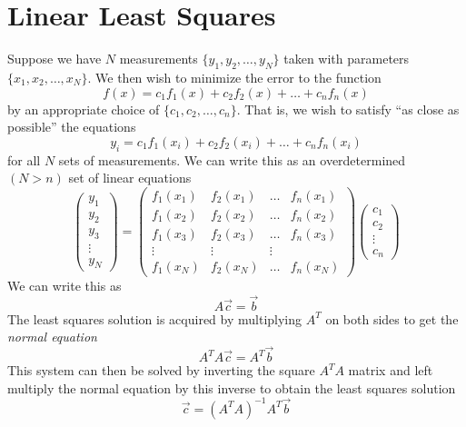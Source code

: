 \section{Linear Least Squares} \label{sec:append_linear_lsq}
Suppose we have $N$ measurements $\{y_1, y_2, \ldots , y_N\}$ taken with parameters $\{x_1, x_2, \ldots , x_N\}$. We then wish to minimize the error to the function
\begin{equation} \label{append_basis_combo}
	f(x) = c_1 f_1(x) + c_2 f_2(x) + \ldots + c_n f_n(x)
\end{equation}
by an appropriate choice of $\{c_1, c_2, \ldots, c_n\}$. That is, we wish to satisfy ``as close as possible'' the equations
\begin{equation}
	y_i = c_1 f_1(x_i) + c_2 f_2(x_i) + \ldots + c_n f_n(x_i)
\end{equation}
for all $N$ sets of measurements. We can write this as an overdetermined $(N>n)$ set of linear equations
\begin{equation} \label{append_lsq_matrix_setup}
	\begin{pmatrix}
		y_1 \\
		y_2 \\
		y_3 \\
		\vdots \\
		y_N
	\end{pmatrix} =
	\begin{pmatrix}
		f_1(x_1) & f_2(x_1) & \ldots & f_n(x_1) \\
		f_1(x_2) & f_2(x_2) & \ldots & f_n(x_2) \\
		f_1(x_3) & f_2(x_3) & \ldots & f_n(x_3) \\
		\vdots & \vdots& \vdots \\
		f_1(x_N) & f_2(x_N) & \ldots & f_n(x_N)
	\end{pmatrix}
	\begin{pmatrix}
		c_1 \\
		c_2 \\
		\vdots \\
		c_n 
	\end{pmatrix}
\end{equation}	
We can write this as
\begin{equation}
	A\vec{c} = \vec{b}
\end{equation}
The least squares solution is acquired by multiplying $A^T$ on both sides to get the \textit{normal equation}
\begin{equation} \label{append_normal_equation}
	A^T A \vec{c} = A^T \vec{b}
\end{equation}
This system can then be solved by inverting the square $A^T A$ matrix and left multiply the normal equation by this inverse to obtain the least squares solution
\begin{equation}\label{append_leastSquares}
	\boxed{\vec{c} = (A^T A)^{-1} A^T \vec{b}}
\end{equation}

